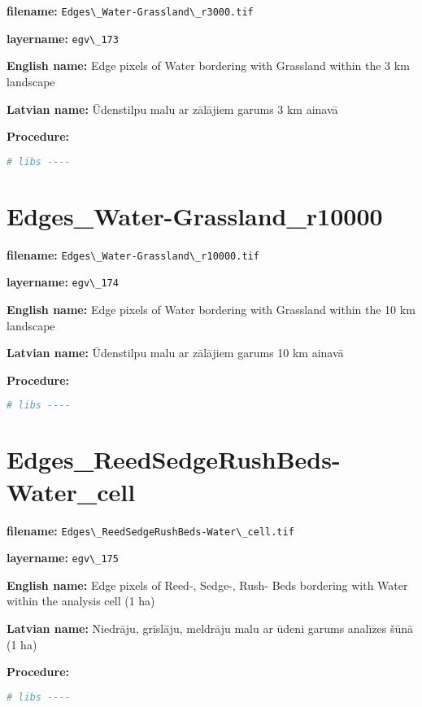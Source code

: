 \documentclass[
]{book}
\newcommand{\passthrough}[1]{#1}
\begin{document}
\textbf{filename:} \passthrough{\lstinline!Edges\_Water-Grassland\_r3000.tif!}

\textbf{layername:} \passthrough{\lstinline!egv\_173!}

\textbf{English name:} Edge pixels of Water bordering with Grassland within the 3 km landscape

\textbf{Latvian name:} Ūdenstilpu malu ar zālājiem garums 3 km ainavā

\textbf{Procedure:}

\begin{lstlisting}[language=R]
# libs ----
\end{lstlisting}

\section{Edges\_Water-Grassland\_r10000}\label{ch06.174}

\textbf{filename:} \passthrough{\lstinline!Edges\_Water-Grassland\_r10000.tif!}

\textbf{layername:} \passthrough{\lstinline!egv\_174!}

\textbf{English name:} Edge pixels of Water bordering with Grassland within the 10 km landscape

\textbf{Latvian name:} Ūdenstilpu malu ar zālājiem garums 10 km ainavā

\textbf{Procedure:}

\begin{lstlisting}[language=R]
# libs ----
\end{lstlisting}

\section{Edges\_ReedSedgeRushBeds-Water\_cell}\label{ch06.175}

\textbf{filename:} \passthrough{\lstinline!Edges\_ReedSedgeRushBeds-Water\_cell.tif!}

\textbf{layername:} \passthrough{\lstinline!egv\_175!}

\textbf{English name:} Edge pixels of Reed-, Sedge-, Rush- Beds bordering with Water within the analysis cell (1 ha)

\textbf{Latvian name:} Niedrāju, grīslāju, meldrāju malu ar ūdeni garums analīzes šūnā (1 ha)

\textbf{Procedure:}

\begin{lstlisting}[language=R]
# libs ----
\end{lstlisting}
\end{document}
